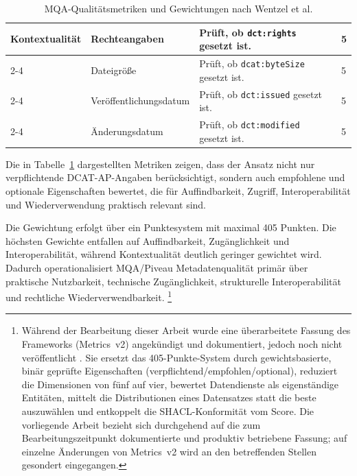 {\begin{table}[H]
\begin{tabular}{|p{2.5cm}|p{3.4cm}|p{5.8cm}|p{1.2cm}|}
Kontextualität 
& Rechteangaben 
& Prüft, ob \texttt{dct:rights} gesetzt ist. 
& 5 \\ \cline{2-4}
& Dateigröße 
& Prüft, ob \texttt{dcat:byteSize} gesetzt ist. 
& 5 \\ \cline{2-4}
& Veröffentlichungsdatum 
& Prüft, ob \texttt{dct:issued} gesetzt ist. 
& 5 \\ \cline{2-4}
& Änderungsdatum 
& Prüft, ob \texttt{dct:modified} gesetzt ist. 
& 5 \\
\hline

\end{tabular}
\caption[MQA-Qualitätsmetriken und Gewichtungen nach Wentzel et al.]{MQA-Qualitätsmetriken und Gewichtungen nach Wentzel et al. \cite{data_europa, wentzel2023extensive}}
\label{tab:mqa_metrics_weights}
\end{table}
\normalsize
} %

Die in Tabelle~\ref{tab:mqa_metrics_weights} dargestellten Metriken zeigen, dass der Ansatz nicht nur verpflichtende DCAT-AP-Angaben berücksichtigt, sondern auch empfohlene und optionale Eigenschaften bewertet, die für Auffindbarkeit, Zugriff, Interoperabilität und Wiederverwendung praktisch relevant sind.

\pagebreak

Die Gewichtung erfolgt über ein Punktesystem mit maximal 405 Punkten. Die höchsten Gewichte entfallen auf Auffindbarkeit, Zugänglichkeit und Interoperabilität, während Kontextualität deutlich geringer gewichtet wird. Dadurch operationalisiert MQA/Piveau Metadatenqualität primär über praktische Nutzbarkeit, technische Zugänglichkeit, strukturelle Interoperabilität und rechtliche Wiederverwendbarkeit. \cite{data_europa, wentzel2023extensive}\footnote{Während der Bearbeitung dieser Arbeit wurde eine überarbeitete Fassung des Frameworks (Metrics~v2) angekündigt und dokumentiert, jedoch noch nicht veröffentlicht \cite{piveauMetricsV2}. Sie ersetzt das 405-Punkte-System durch gewichtsbasierte, binär geprüfte Eigenschaften (verpflichtend/empfohlen/optional), reduziert die Dimensionen von fünf auf vier, bewertet Datendienste als eigenständige Entitäten, mittelt die Distributionen eines Datensatzes statt die beste auszuwählen und entkoppelt die SHACL-Konformität vom Score. Die vorliegende Arbeit bezieht sich durchgehend auf die zum Bearbeitungszeitpunkt dokumentierte und produktiv betriebene Fassung; auf einzelne Änderungen von Metrics~v2 wird an den betreffenden Stellen gesondert eingegangen.}

